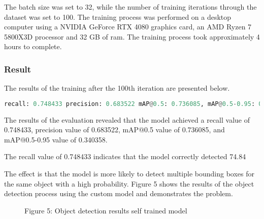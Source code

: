 The batch size was set to 32, while the number of training iterations through the dataset was set to 100. The training process was performed on a desktop computer using a NVIDIA GeForce RTX 4080 graphics card, an AMD Ryzen 7 5800X3D processor and 32 GB of ram. The training process took approximately 4 hours to complete.


\subsubsection{Result }

The results of the training after the 100th iteration are presented below.

\begin{lstlisting}[language=python]
    recall: 0.748433 precision: 0.683522 mAP@0.5: 0.736085, mAP@0.5-0.95: 0.340358
\end{lstlisting}

The results of the evaluation revealed that the model achieved a recall value of 0.748433, precision value of 0.683522, mAP@0.5 value of 0.736085, and mAP@0.5-0.95 value of 0.340358. 

The recall value of 0.748433 indicates that the model correctly detected 74.84%

The effect is that the model is more likely to detect multiple bounding boxes for the same object with a high probability. Figure 5 shows the results of the object detection process using the custom model and demonstrates the problem. 

\begin{figure}[!h]
    \centering
    \caption{Figure 5: Object detection results self trained model }
\end{figure}

